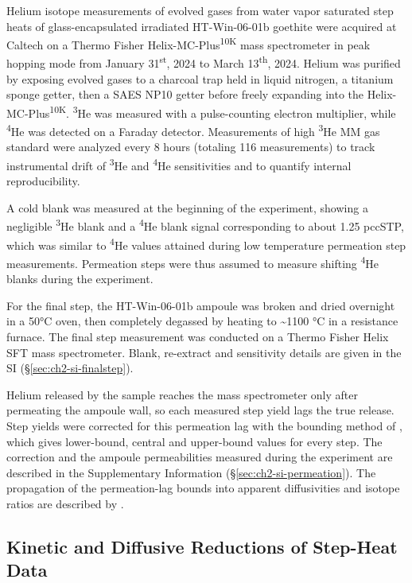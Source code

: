Helium isotope measurements of evolved gases from water vapor saturated step heats of glass-encapsulated irradiated HT-Win-06-01b goethite were
acquired at Caltech on a Thermo Fisher
Helix-MC-Plus\textsuperscript{10K} mass spectrometer in peak hopping
mode from January 31\textsuperscript{st}, 2024 to March
13\textsuperscript{th}, 2024. Helium was purified by exposing evolved
gases to a charcoal trap held in liquid nitrogen, a titanium sponge
getter, then a SAES NP10 getter before freely expanding into the
Helix-MC-Plus\textsuperscript{10K}. \textsuperscript{3}He was measured with a
pulse-counting electron multiplier, while \textsuperscript{4}He was detected on a Faraday
detector. Measurements of high \textsuperscript{3}He MM gas standard were analyzed every 8 hours
(totaling 116 measurements) to track instrumental drift of \textsuperscript{3}He and \textsuperscript{4}He
sensitivities and to quantify internal reproducibility.

A cold blank was measured at the beginning of the experiment, showing a
negligible \textsuperscript{3}He blank and a \textsuperscript{4}He blank signal
corresponding to about 1.25 pccSTP, which was similar to \textsuperscript{4}He values
attained during low temperature permeation step measurements. Permeation
steps were thus assumed to measure shifting \textsuperscript{4}He blanks during the
experiment.

For the final step, the HT-Win-06-01b ampoule was broken and dried
overnight in a 50°C oven, then completely degassed by heating to
\textasciitilde1100 °C in a resistance furnace. The final step
measurement was conducted on a Thermo Fisher Helix SFT mass spectrometer. Blank, re-extract and sensitivity details are given in the SI (\S\ref{sec:ch2-si-finalstep}).

Helium released by the sample reaches the mass spectrometer only after permeating the ampoule
wall, so each measured step yield lags the true release. Step yields were corrected for this
permeation lag with the bounding method of \citet{thyer2026method},
which gives lower-bound, central and upper-bound values for every step. The correction and the
ampoule permeabilities measured during the experiment are described in the Supplementary
Information (\S\ref{sec:ch2-si-permeation}). The propagation of the permeation-lag bounds into apparent
diffusivities and isotope ratios are described by \citet{thyer2026thesis}.

\subsection{Kinetic and Diffusive Reductions of Step-Heat Data}\label{sec:gt_kin_methods}

